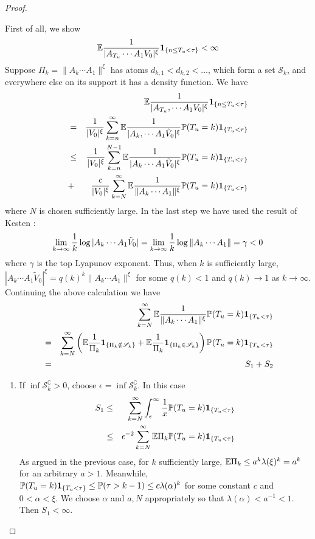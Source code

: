 \documentclass{article}
\begin{document}
\begin{proof}
\begin{enumerate}
    First of all, we show
    \[
    \mathbb{E} {1 \over |A_{T_u} \cdots A_1 V_0|^\xi}\mathbf{1}_{\{n \leq T_u < \tau\}} < \infty
    \]
    Suppose $\Pi_k = \|A_k \cdots A_1\|^\xi$
    has atoms $d_{k,1} < d_{k,2} < \dots$, which form a set $\mathscr S_k$,
    and everywhere else on its support it has a density function. We have
    \begin{eqnarray*}
      && \mathbb{E} {1 \over |A_{T_u}, \cdots A_1 V_0|^\xi} \mathbf{1}_{\{n \leq T_u < \tau\}}\\
      &=& {1 \over |V_0|^{\xi}} \sum_{k=n}^\infty \mathbb{E} {1 \over |A_k,
        \cdots A_1 \tilde V_0|^{\xi}} \mathbb{P}(T_u = k) \mathbf{1}_{\{T_u < \tau\}} \\
      &\leq& {1 \over |V_0|^\xi} \sum_{k=n}^{N-1}
      \mathbb{E} {1 \over |A_k \cdots A_1 \tilde V_0|^\xi}  \mathbb{P}(T_u = k) \mathbf{1}_{\{T_u
        < \tau\}}\\
      &+& {c \over |V_0|^\xi} \sum_{k=N}^{\infty}
      \mathbb{E} {1 \over \|A_k \cdots A_1\|^\xi}  \mathbb{P}(T_u = k) \mathbf{1}_{\{T_u
        < \tau\}}
      \end{eqnarray*}
      where $N$ is chosen sufficiently large. In the last step we have
      used the result of Kesten
      \cite{Kesten1973}:
      \[
      \lim_{k \to \infty} {1 \over k} \log |A_k \cdots A_1 \tilde V_0|
      = \lim_{k \to \infty} {1 \over k} \log \|A_k \cdots A_1\| =
      \gamma < 0
      \]
      where $\gamma$ is the top Lyapunov exponent. Thus, when $k$ is
      sufficiently large, $|A_k \cdots A_1 \tilde V_0|^\xi = q(k)^k \|A_k
      \cdots A_1\|^\xi$ for some $q(k) < 1$ and $q(k) \to 1$ as $k \to
      \infty$. Continuing the above calculation we have
      \begin{eqnarray*}
        && \sum_{k=N}^{\infty}
        \mathbb{E} {1 \over \|A_k \cdots A_1\|^\xi}  \mathbb{P}(T_u = k) \mathbf{1}_{\{T_u
          < \tau\}} \\
        &=& \sum_{k=N}^{\infty}
        \left(
          \mathbb{E} {1 \over \Pi_k}\mathbf{1}_{\{\Pi_k \notin \mathscr S_k\}}
          + \mathbb{E} {1 \over \Pi_k}\mathbf{1}_{\{\Pi_k \in \mathscr S_k\}}
        \right) \mathbb{P}(T_u = k) \mathbf{1}_{\{T_u < \tau\}} \\
        &=& S_1 + S_2
      \end{eqnarray*}
      \begin{enumerate}
      \item If $\inf \mathscr S_k^\complement > 0$, choose $\epsilon = \inf \mathscr
        S_k^\complement$. In this case
        \begin{eqnarray*}
          S_1 &\leq& \sum_{k=N}^\infty \int_\epsilon^\infty
          {1 \over x}
          \mathbb{P}(T_u = k) \mathbf{1}_{\{T_u < \tau\}} \\
          &\leq& \epsilon^{-2} \sum_{k=N}^\infty \mathbb{E} \Pi_k
          \mathbb{P}(T_u = k) \mathbf{1}_{\{T_u < \tau\}}
        \end{eqnarray*}
        As argued in the previous case, for $k$ sufficiently large,
        $\mathbb{E} \Pi_k \leq a^k \lambda(\xi)^k = a^k$ for an arbitrary $a >
        1$. Meanwhile, $\mathbb{P}(T_u = k)\mathbf{1}_{\{T_u < \tau\}} \leq \mathbb{P}(\tau >
        k-1) \leq c \lambda(\alpha)^k$ for some constant $c$ and $0 <
        \alpha < \xi$. We choose $\alpha$ and $a, N$ appropriately so
        that $\lambda(\alpha) <  a^{-1} < 1$. Then $S_1 < \infty$.


\end{enumerate}
\end{enumerate}
\end{proof}
\end{document}
